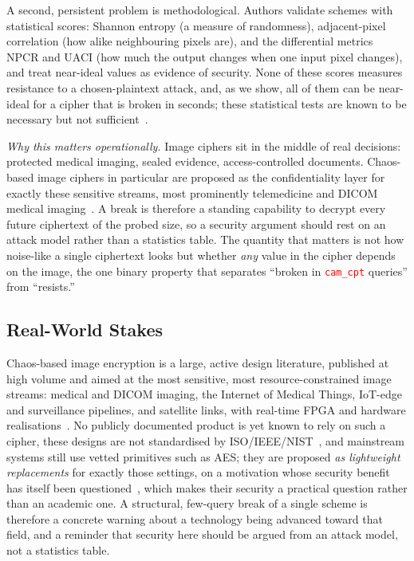 \documentclass[conference,a4paper]{IEEEtran}
\newcommand{\PH}[1]{\textcolor{red}{\texttt{#1}}}
\begin{document}
A second, persistent problem is methodological. Authors validate schemes with statistical scores:
Shannon entropy (a measure of randomness), adjacent-pixel correlation (how alike neighbouring pixels
are), and the differential metrics NPCR and UACI (how much the output changes when one input pixel
changes), and treat near-ideal values as evidence of security. None of these scores measures resistance to a
chosen-plaintext attack, and, as we show, all of them can be near-ideal for a cipher that is broken in
seconds; these statistical tests are known to be necessary but not sufficient~\cite{preishuber2018}.

\emph{Why this matters operationally.} Image ciphers sit in the middle of real decisions: protected medical
imaging, sealed evidence, access-controlled documents. Chaos-based image ciphers in particular are proposed
as the confidentiality layer for exactly these sensitive streams, most prominently telemedicine and DICOM
medical imaging~\cite{alnassan2024dicom}. A break is therefore a standing capability to decrypt every future ciphertext of the probed size, so a security argument should rest on an attack model rather than a statistics table. The quantity that matters is not how noise-like a
single ciphertext looks but whether \emph{any} value in the cipher depends on the image, the one binary
property that separates ``broken in \PH{cam_cpt} queries'' from ``resists.''

\subsection{Real-World Stakes}
Chaos-based image encryption is a large, active design literature, published at
high volume and aimed at the most sensitive, most resource-constrained image streams: medical and DICOM
imaging, the Internet of Medical Things, IoT-edge and surveillance pipelines, and satellite links, with
real-time FPGA and hardware realisations~\cite{chaosfpga2025}. No publicly documented product is yet known to rely on
such a cipher, these designs are not standardised by ISO/IEEE/NIST~\cite{teh2020practical}, and mainstream
systems still use vetted primitives such as AES; they are proposed \emph{as lightweight replacements} for
exactly those settings, on a motivation whose security benefit has itself been
questioned~\cite{preishuber2018}, which makes their security a practical question rather than an academic
one. A structural, few-query break of a single scheme is therefore a concrete warning about a technology
being advanced toward that field, and a reminder that security here should be argued from an attack
model, not a statistics table.
\end{document}
